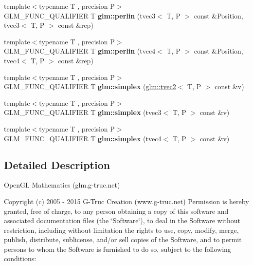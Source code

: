 \begin{DoxyCompactItemize}
\item 
\hypertarget{namespaceglm_add9522a1426ca2f1499daf7603500269}{{\footnotesize template$<$typename T , precision P$>$ }\\G\-L\-M\-\_\-\-F\-U\-N\-C\-\_\-\-Q\-U\-A\-L\-I\-F\-I\-E\-R T {\bfseries glm\-::perlin} (tvec3$<$ T, P $>$ const \&Position, tvec3$<$ T, P $>$ const \&rep)}\label{namespaceglm_add9522a1426ca2f1499daf7603500269}

\item 
\hypertarget{namespaceglm_aac7a6a7b23c4852eb1024f5b9564142f}{{\footnotesize template$<$typename T , precision P$>$ }\\G\-L\-M\-\_\-\-F\-U\-N\-C\-\_\-\-Q\-U\-A\-L\-I\-F\-I\-E\-R T {\bfseries glm\-::perlin} (tvec4$<$ T, P $>$ const \&Position, tvec4$<$ T, P $>$ const \&rep)}\label{namespaceglm_aac7a6a7b23c4852eb1024f5b9564142f}

\item 
\hypertarget{namespaceglm_afdd43ecc519f98c7550e8850c030f1a8}{{\footnotesize template$<$typename T , precision P$>$ }\\G\-L\-M\-\_\-\-F\-U\-N\-C\-\_\-\-Q\-U\-A\-L\-I\-F\-I\-E\-R T {\bfseries glm\-::simplex} (\hyperlink{structglm_1_1tvec2}{glm\-::tvec2}$<$ T, P $>$ const \&v)}\label{namespaceglm_afdd43ecc519f98c7550e8850c030f1a8}

\item 
\hypertarget{namespaceglm_ad251ced23dfd0c991b7e06b5a398dfe5}{{\footnotesize template$<$typename T , precision P$>$ }\\G\-L\-M\-\_\-\-F\-U\-N\-C\-\_\-\-Q\-U\-A\-L\-I\-F\-I\-E\-R T {\bfseries glm\-::simplex} (tvec3$<$ T, P $>$ const \&v)}\label{namespaceglm_ad251ced23dfd0c991b7e06b5a398dfe5}

\item 
\hypertarget{namespaceglm_a302e8f4466cd88ebd9581e67c8368254}{{\footnotesize template$<$typename T , precision P$>$ }\\G\-L\-M\-\_\-\-F\-U\-N\-C\-\_\-\-Q\-U\-A\-L\-I\-F\-I\-E\-R T {\bfseries glm\-::simplex} (tvec4$<$ T, P $>$ const \&v)}\label{namespaceglm_a302e8f4466cd88ebd9581e67c8368254}

\end{DoxyCompactItemize}


\subsection{Detailed Description}
Open\-G\-L Mathematics (glm.\-g-\/truc.\-net)

Copyright (c) 2005 -\/ 2015 G-\/\-Truc Creation (www.\-g-\/truc.\-net) Permission is hereby granted, free of charge, to any person obtaining a copy of this software and associated documentation files (the \char`\"{}\-Software\char`\"{}), to deal in the Software without restriction, including without limitation the rights to use, copy, modify, merge, publish, distribute, sublicense, and/or sell copies of the Software, and to permit persons to whom the Software is furnished to do so, subject to the following conditions\-:


